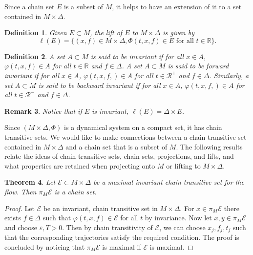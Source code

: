 \documentclass[11pt]{article}
\newtheorem{thm}{Theorem}
\newtheorem{defn}[thm]{Definition}
\newtheorem{remark}[thm]{Remark}
\begin{document}
\indent Since a chain set $E$ is a subset of $M$, it helps to have an extension of it to a set contained in $M\times \Delta$. 

\begin{defn}
Given $E\subset M$, the lift of $E$ to $M\times\Delta$ is given by
$$\ell(E)=\{(x,f)\in M\times\Delta,\Phi(t,x,f)\in E \text{ for all }t\in\mathbb{R}\}.$$
\end{defn}

\begin{defn}
A set $A\subset M$ is said to be invariant if for all $x\in A$, $\varphi(t,x,f)\in A$ for all $t\in\mathbb{R}$ and $f\in\Delta$.
A set $A\subset M$ is said to be forward invariant if for all $x\in A$, $\varphi(t,x,f,)\in A$ for all $t\in \mathcal{R}^+$ and $f\in\Delta$.  Similarly, a set $A\subset M$ is said to be backward invariant if for all $x\in A$, $\varphi(t,x,f,)\in A$ for all $t\in \mathcal{R}^-$ and $f\in\Delta$.
\end{defn}


\begin{remark}
Notice that if $E$ is invariant, $\ell(E)=\Delta\times E$. 
\end{remark}

Since $(M\times\Delta,\Phi)$ is a dynamical system on a compact set, it has chain transitive sets.  We would like to make connections between a chain transitive set contained in $M\times \Delta$ and a chain set that is a subset of $M$.  The following results relate the ideas of chain transitive sets, chain sets, projections, and lifts, and what properties are retained when projecting onto $M$ or lifting to $M\times \Delta$. 


\begin{thm}\label{max chain set}
Let $\mathcal{E}\subset M\times\Delta$ be a maximal invariant chain transitive set for the flow.  Then $\pi_M\mathcal{E}$ is a chain set.
\end{thm}
\begin{proof}
Let $\mathcal{E}$ be an invariant, chain transitive set in $M\times\Delta$.  For $x\in\pi_M\mathcal{E}$ there exists $f\in\Delta$ such that $\varphi(t,x,f)\in\mathcal{E}$ for all $t$ by invariance.  Now let $x,y\in \pi_M\mathcal{E}$ and choose $\varepsilon, T>0$.  Then by chain transitivity of $\mathcal{E}$, we can choose $x_j, f_j, t_j$ such that the corresponding trajectories satisfy the required condition.  The proof is concluded by noticing that $\pi_M\mathcal{E}$ is maximal if $\mathcal{E}$ is maximal.

\end{proof}
\end{document}
